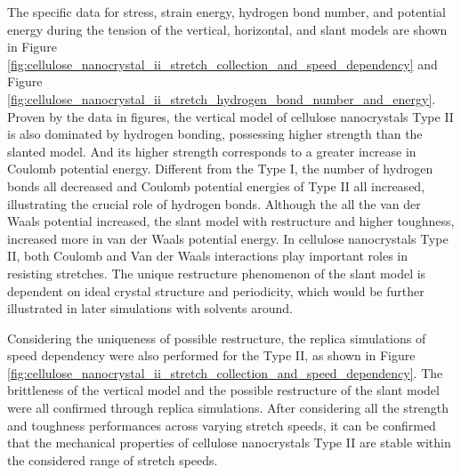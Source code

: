 \documentclass{article}
\begin{document}
The specific data for stress, strain energy, hydrogen bond number, and potential energy during the tension of the vertical, horizontal, and slant models are shown in Figure \ref{fig:cellulose_nanocrystal_ii_stretch_collection_and_speed_dependency} and Figure \ref{fig:cellulose_nanocrystal_ii_stretch_hydrogen_bond_number_and_energy}.
Proven by the data in figures, the vertical model of cellulose nanocrystals Type II is also dominated by hydrogen bonding, possessing higher strength than the slanted model.
And its higher strength corresponds to a greater increase in Coulomb potential energy.
Different from the Type I, the number of hydrogen bonds all decreased and Coulomb potential energies of Type II all increased, illustrating the crucial role of hydrogen bonds.
Although the all the van der Waals potential increased, the slant model with restructure and higher toughness, increased more in van der Waals potential energy.
In cellulose nanocrystals Type II, both Coulomb and Van der Waals interactions play important roles in resisting stretches.
The unique restructure phenomenon of the slant model is dependent on ideal crystal structure and periodicity, which would be further illustrated in later simulations with solvents around.

Considering the uniqueness of possible restructure, the replica simulations of speed dependency were also performed for the Type II, as shown in Figure \ref{fig:cellulose_nanocrystal_ii_stretch_collection_and_speed_dependency}.
The brittleness of the vertical model and the possible restructure of the slant model were all confirmed through replica simulations.
After considering all the strength and toughness performances across varying stretch speeds, it can be confirmed that the mechanical properties of cellulose nanocrystals Type II are stable within the considered range of stretch speeds.
\end{document}
